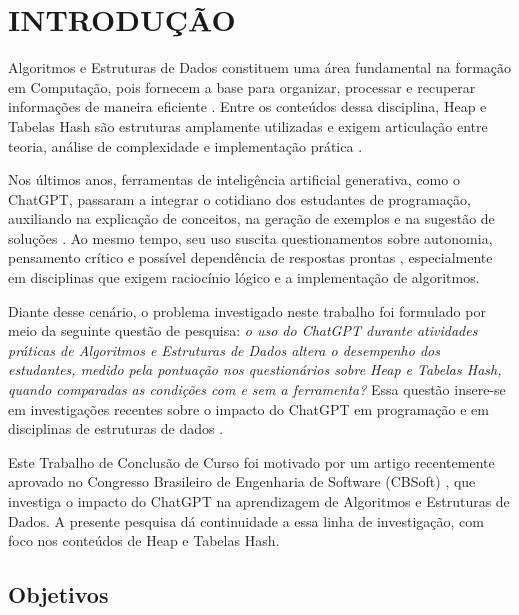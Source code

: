 
\chapter{INTRODUÇÃO}
\label{chap:introducao}

Algoritmos e Estruturas de Dados constituem uma área fundamental na formação em Computação, pois fornecem a base para organizar, processar e recuperar informações de maneira eficiente \cite{leblanc2015se2014,cormen2022introduction}. Entre os conteúdos dessa disciplina, Heap e Tabelas Hash são estruturas amplamente utilizadas e exigem articulação entre teoria, análise de complexidade e implementação prática \cite{cormen2022introduction}.

Nos últimos anos, ferramentas de inteligência artificial generativa, como o ChatGPT, passaram a integrar o cotidiano dos estudantes de programação, auxiliando na explicação de conceitos, na geração de exemplos e na sugestão de soluções \cite{baidoo2023education,rahman2023education,garcia2025programming}. Ao mesmo tempo, seu uso suscita questionamentos sobre autonomia, pensamento crítico e possível dependência de respostas prontas \cite{dwivedi2023chatgpt,delikoura2025superficial,qin2023general}, especialmente em disciplinas que exigem raciocínio lógico e a implementação de algoritmos.

Diante desse cenário, o problema investigado neste trabalho foi formulado por meio da seguinte questão de pesquisa: \textit{o uso do ChatGPT durante atividades práticas de Algoritmos e Estruturas de Dados altera o desempenho dos estudantes, medido pela pontuação nos questionários sobre Heap e Tabelas Hash, quando comparadas as condições com e sem a ferramenta?} Essa questão insere-se em investigações recentes sobre o impacto do ChatGPT em programação e em disciplinas de estruturas de dados \cite{jamie2024dsa,kosar2024chatgpt}.

Este Trabalho de Conclusão de Curso foi motivado por um artigo recentemente aprovado no Congresso Brasileiro de Engenharia de Software (CBSoft) \cite{neto2026chatgpt}, que investiga o impacto do ChatGPT na aprendizagem de Algoritmos e Estruturas de Dados. A presente pesquisa dá continuidade a essa linha de investigação, com foco nos conteúdos de Heap e Tabelas Hash.

\section{Objetivos}

